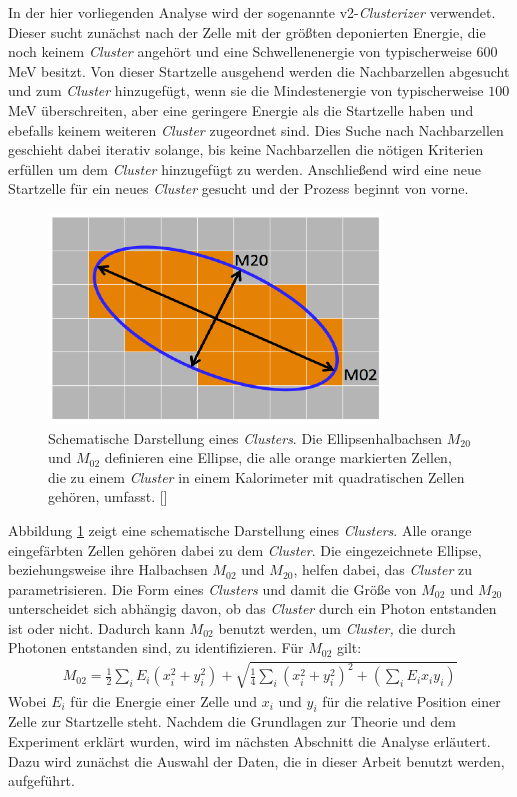 In der hier vorliegenden Analyse wird der sogenannte v2-\textit{Clusterizer} verwendet.
Dieser sucht zunächst nach der Zelle mit der größten deponierten Energie, die noch keinem \textit{Cluster} angehört und eine Schwellenenergie von typischerweise $600$ MeV besitzt.
Von dieser Startzelle ausgehend werden die Nachbarzellen abgesucht und zum \textit{Cluster} hinzugefügt, wenn sie die Mindestenergie von typischerweise $100$ MeV überschreiten, aber eine geringere Energie als die Startzelle haben und ebefalls keinem weiteren \textit{Cluster} zugeordnet sind.
Dies Suche nach Nachbarzellen geschieht dabei iterativ solange, bis keine Nachbarzellen die nötigen Kriterien erfüllen um dem \textit{Cluster} hinzugefügt zu werden.
Anschließend wird eine neue Startzelle für ein neues \textit{Cluster} gesucht und der Prozess beginnt von vorne.
\begin{figure}[t!]
\centering
\includegraphics[width=.35\linewidth]{m02&m20.png}
\caption{Schematische Darstellung eines \textit{Clusters}. Die Ellipsenhalbachsen $M_{20}$ und $M_{02}$ definieren eine Ellipse, die alle orange markierten Zellen, die zu einem \textit{Cluster} in einem Kalorimeter mit quadratischen Zellen gehören, umfasst.
[\cite{thesis:Adrian}]}
\label{fig:$M_{20}$}
\end{figure}
Abbildung \ref{fig:$M_{20}$} zeigt eine schematische Darstellung eines \textit{Clusters}.
Alle orange eingefärbten Zellen gehören dabei zu dem \textit{Cluster}.
Die eingezeichnete Ellipse, beziehungsweise ihre Halbachsen $M_{02}$ und $M_{20}$, helfen dabei, das \textit{Cluster} zu parametrisieren.
Die Form eines \textit{Clusters} und damit die Größe von $M_{02}$ und $M_{20}$ unterscheidet sich abhängig davon, ob das \textit{Cluster} durch ein Photon entstanden ist oder nicht.
Dadurch kann $M_{02}$ benutzt werden, um \textit{Cluster,} die durch Photonen entstanden sind, zu identifizieren.
Für $M_{02}$ gilt:
\begin{align} 
M_{02} = \frac{1}{2}\sum_{i}E_{i}(x_{i}^{2}+y_{i}^{2})+\sqrt{\frac{1}{4}\sum_{i}\left(x_{i}^{2}+y_{i}^{2}\right)^{2}+\left(\sum_{i}E_{i}x_{i}y_{i}\right)}
\end{align}
Wobei $E_{i}$ für die Energie einer Zelle und $x_{i}$ und $y_{i}$ für die relative Position einer Zelle zur Startzelle steht.
\newline
Nachdem die Grundlagen zur Theorie und dem Experiment erklärt wurden, wird im nächsten Abschnitt die Analyse erläutert.
Dazu wird zunächst die Auswahl der Daten, die in dieser Arbeit benutzt werden, aufgeführt.